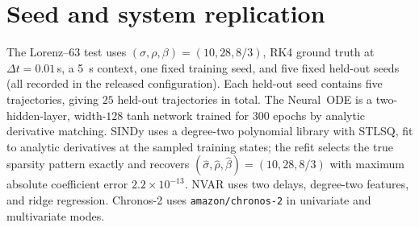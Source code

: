 \documentclass{article}
\begin{document}
\section{Seed and system replication}
The Lorenz--63 test uses $(\sigma,\rho,\beta)=(10,28,8/3)$, RK4 ground truth at $\Delta t{=}0.01$\,s, a 5~s
context, one fixed training seed, and five fixed held-out seeds (all recorded in the released
configuration). Each held-out seed contains five trajectories, giving $25$ held-out
trajectories in total. The Neural~ODE is a two-hidden-layer, width-$128$ tanh network trained
for $300$ epochs by analytic derivative matching. SINDy uses a degree-two polynomial library
with STLSQ, fit to analytic derivatives at the sampled training states; the refit selects the
true sparsity pattern exactly and recovers
$(\hat\sigma,\hat\rho,\hat\beta)=(10,28,8/3)$ with maximum absolute coefficient error
$2.2\times10^{-13}$. NVAR uses two delays, degree-two features, and ridge regression.
Chronos-2 uses \texttt{amazon/chronos-2} in univariate and multivariate modes.
\end{document}
